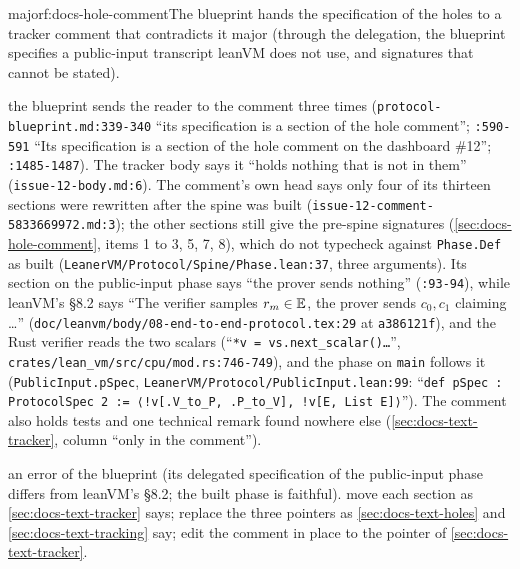 \begin{finding}{major}{f:docs-hole-comment}{The blueprint hands the specification of the holes to a tracker comment that contradicts it}
 major (through the delegation, the blueprint specifies a public-input transcript leanVM does not use, and signatures that cannot be stated).
 \begin{sloppypar}
the blueprint sends the reader to the comment three times (\texttt{protocol-\allowbreak{}blueprint.\allowbreak{}md:\allowbreak{}339-\allowbreak{}340} ``its specification is a section of the hole comment''; \texttt{:\allowbreak{}590-\allowbreak{}591} ``Its specification is a section of the hole comment on the dashboard \#12''; \texttt{:\allowbreak{}1485-\allowbreak{}1487}). The tracker body says it ``holds nothing that is not in them'' (\texttt{issue-\allowbreak{}12-\allowbreak{}body.\allowbreak{}md:\allowbreak{}6}). The comment's own head says only four of its thirteen sections were rewritten after the spine was built (\texttt{issue-\allowbreak{}12-\allowbreak{}comment-\allowbreak{}5833669972.\allowbreak{}md:\allowbreak{}3}); the other sections still give the pre-spine signatures (\cref{sec:docs-hole-comment}, items 1 to 3, 5, 7, 8), which do not typecheck against \texttt{Phase.\allowbreak{}Def} as built (\texttt{Leaner\allowbreak{}VM/\allowbreak{}Protocol/\allowbreak{}Spine/\allowbreak{}Phase.\allowbreak{}lean:\allowbreak{}37}, three arguments). Its section on the public-input phase says ``the prover sends nothing'' (\texttt{:\allowbreak{}93-\allowbreak{}94}), while leanVM's §8.2 says ``The verifier samples $r_m\in\mathbb{E}$, the prover sends $c_0,c_1$ claiming …'' (\texttt{doc/\allowbreak{}leanvm/\allowbreak{}body/\allowbreak{}08-\allowbreak{}end-\allowbreak{}to-\allowbreak{}end-\allowbreak{}protocol.\allowbreak{}tex:\allowbreak{}29} at \texttt{a386121f}), and the Rust verifier reads the two scalars (``\texttt{*v = vs.\allowbreak{}next\_\allowbreak{}scalar(\allowbreak{})…}'', \texttt{crates/\allowbreak{}lean\_\allowbreak{}vm/\allowbreak{}src/\allowbreak{}cpu/\allowbreak{}mod.\allowbreak{}rs:\allowbreak{}746-\allowbreak{}749}), and the phase on \texttt{main} follows it (\texttt{Public\allowbreak{}Input.\allowbreak{}p\allowbreak{}Spec}, \texttt{Leaner\allowbreak{}VM/\allowbreak{}Protocol/\allowbreak{}Public\allowbreak{}Input.\allowbreak{}lean:\allowbreak{}99}: ``\texttt{def p\allowbreak{}Spec :\allowbreak{} Protocol\allowbreak{}Spec 2 :\allowbreak{}= ⟨!v[.\allowbreak{}V\_\allowbreak{}to\_\allowbreak{}P,\allowbreak{} .\allowbreak{}P\_\allowbreak{}to\_\allowbreak{}V],\allowbreak{} !v[E,\allowbreak{} List E]⟩}''). The comment also holds tests and one technical remark found nowhere else (\cref{sec:docs-text-tracker}, column ``only in the comment'').
\end{sloppypar}
 an error of the blueprint (its delegated specification of the public-input phase differs from leanVM's §8.2; the built phase is faithful).
 move each section as \cref{sec:docs-text-tracker} says; replace the three pointers as \cref{sec:docs-text-holes} and \cref{sec:docs-text-tracking} say; edit the comment in place to the pointer of \cref{sec:docs-text-tracker}.
\end{finding}

